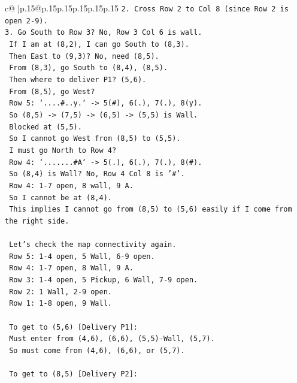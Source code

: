 \documentclass{article}
\begin{document}
{\begin{supertabular}{c@{$\;$}|p{.15\linewidth}@{}p{.15\linewidth}p{.15\linewidth}p{.15\linewidth}p{.15\linewidth}p{.15\linewidth}}
{{{\texttt{2. Cross Row 2 to Col 8 (since Row 2 is open 2{-}9).} \\
\texttt{3. Go South to Row 3? No, Row 3 Col 6 is wall.} \\
\texttt{   If I am at (8,2), I can go South to (8,3).} \\
\texttt{   Then East to (9,3)? No, need (8,5).} \\
\texttt{   From (8,3), go South to (8,4), (8,5).} \\
\texttt{   Then where to deliver P1? (5,6).} \\
\texttt{   From (8,5), go West?} \\
\texttt{   Row 5: `....\#..y.` {-}> 5(\#), 6(.), 7(.), 8(y).} \\
\texttt{   So (8,5) {-}> (7,5) {-}> (6,5) {-}> (5,5) is Wall.} \\
\texttt{   Blocked at (5,5).} \\
\texttt{   So I cannot go West from (8,5) to (5,5).} \\
\texttt{   I must go North to Row 4?} \\
\texttt{   Row 4: `.......\#A` {-}> 5(.), 6(.), 7(.), 8(\#).} \\
\texttt{   So (8,4) is Wall? No, Row 4 Col 8 is '\#'.} \\
\texttt{   Row 4: 1{-}7 open, 8 wall, 9 A.} \\
\texttt{   So I cannot be at (8,4).} \\
\texttt{   This implies I cannot go from (8,5) to (5,6) easily if I come from the right side.} \\
\\ 
\texttt{   Let's check the map connectivity again.} \\
\texttt{   Row 5: 1{-}4 open, 5 Wall, 6{-}9 open.} \\
\texttt{   Row 4: 1{-}7 open, 8 Wall, 9 A.} \\
\texttt{   Row 3: 1{-}4 open, 5 Pickup, 6 Wall, 7{-}9 open.} \\
\texttt{   Row 2: 1 Wall, 2{-}9 open.} \\
\texttt{   Row 1: 1{-}8 open, 9 Wall.} \\
\\ 
\texttt{   To get to (5,6) {[}Delivery P1{]}:} \\
\texttt{   Must enter from (4,6), (6,6), (5,5){-}Wall, (5,7).} \\
\texttt{   So must come from (4,6), (6,6), or (5,7).} \\
\\ 
\texttt{   To get to (8,5) {[}Delivery P2{]}:} \\
}}}
\end{supertabular}}
\end{document}
